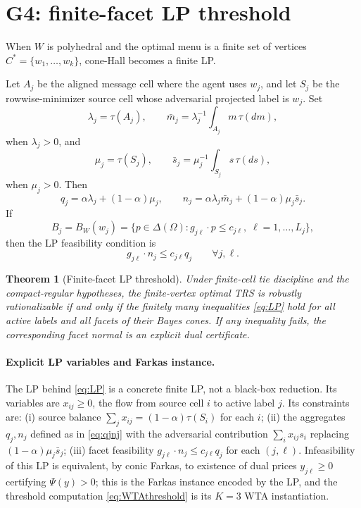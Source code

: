 \documentclass[11pt]{article}
\newtheorem{theorem}{Theorem}
\theoremstyle{definition}
\theoremstyle{remark}
\newcommand{\Om}{\Omega}
\begin{document}
\section{G4: finite-facet LP threshold}\label{sec:g4}

When $W$ is polyhedral and the optimal menu is a finite set of vertices $C^*=\{w_1,\ldots,w_k\}$, cone-Hall becomes a finite LP.

Let $A_j$ be the aligned message cell where the agent uses $w_j$, and let $S_j$ be the rowwise-minimizer source cell whose adversarial projected label is $w_j$. Set
\[
  \lambda_j=\tau(A_j),
  \qquad
  \bar m_j=\lambda_j^{-1}\int_{A_j}m\,\tau(dm),
\]
when $\lambda_j>0$, and
\[
  \mu_j=\tau(S_j),
  \qquad
  \bar s_j=\mu_j^{-1}\int_{S_j}s\,\tau(ds),
\]
when $\mu_j>0$. Then
\begin{equation}\label{eq:qjnj}
  q_j=\alpha\lambda_j+(1-\alpha)\mu_j,
  \qquad
  n_j=\alpha\lambda_j\bar m_j+(1-\alpha)\mu_j\bar s_j.
\end{equation}
If
\[
  B_j=B_W(w_j)=\{p\in\Delta(\Om): g_{j\ell}\cdot p\le c_{j\ell},\;\ell=1,\ldots,L_j\},
\]
then the LP feasibility condition is
\begin{equation}\label{eq:LP}
  g_{j\ell}\cdot n_j\le c_{j\ell}q_j
  \qquad\forall j,\ell.
\end{equation}

\begin{theorem}[Finite-facet LP threshold]\label{thm:G4}
Under finite-cell tie discipline and the compact-regular hypotheses, the finite-vertex optimal TRS is robustly rationalizable if and only if the finitely many inequalities \eqref{eq:LP} hold for all active labels and all facets of their Bayes cones. If any inequality fails, the corresponding facet normal is an explicit dual certificate.
\end{theorem}

\paragraph{Explicit LP variables and Farkas instance.} The LP behind \eqref{eq:LP} is a concrete finite LP, not a black-box reduction. Its variables are $x_{ij}\ge0$, the flow from source cell $i$ to active label $j$. Its constraints are: (i) source balance $\sum_j x_{ij}=(1-\alpha)\tau(S_i)$ for each $i$; (ii) the aggregates $q_j,n_j$ defined as in \eqref{eq:qjnj} with the adversarial contribution $\sum_i x_{ij}s_i$ replacing $(1-\alpha)\mu_j\bar s_j$; (iii) facet feasibility $g_{j\ell}\cdot n_j\le c_{j\ell}q_j$ for each $(j,\ell)$. Infeasibility of this LP is equivalent, by conic Farkas, to existence of dual prices $y_{j\ell}\ge0$ certifying $\Psi(y)>0$; this is the Farkas instance encoded by the LP, and the threshold computation \eqref{eq:WTAthreshold} is its $K=3$ WTA instantiation.
\end{document}
